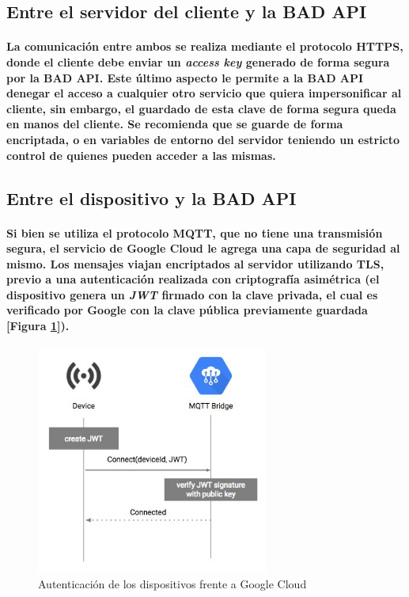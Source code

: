 \documentclass{article}
\begin{document}
\subsection{Entre el servidor del cliente y la BAD API}
\paragraph{
La comunicación entre ambos se realiza mediante el protocolo HTTPS, donde el cliente debe enviar un \textit{access key} generado de forma segura por la BAD API. Este último aspecto le permite a la BAD API denegar el acceso a cualquier otro servicio que quiera impersonificar al cliente, sin embargo, el guardado de esta clave de forma segura queda en manos del cliente. Se recomienda que se guarde de forma encriptada, o en variables de entorno del servidor teniendo un estricto control de quienes pueden acceder a las mismas.
}
\subsection{Entre el dispositivo y la BAD API}
\paragraph{
Si bien se utiliza el protocolo MQTT, que no tiene una transmisión segura, el servicio de Google Cloud le agrega una capa de seguridad al mismo. Los mensajes viajan encriptados al servidor utilizando TLS, previo a una autenticación realizada con criptografía asimétrica (el dispositivo genera un \textit{JWT} firmado con la clave privada, el cual es verificado por Google con la clave pública previamente guardada [Figura \ref{fig:tokencreation}]).
}

\begin{figure}[ht]
    \centering
    \includegraphics[width=3in]{token-creation.jpeg}%
    \caption{Autenticación de los dispositivos frente a Google Cloud}
    \label{fig:tokencreation}
\end{figure}
\end{document}
